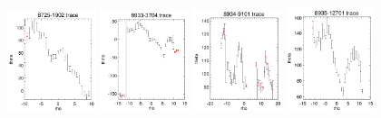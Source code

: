 \documentclass[fleqn,usenatbib]{mnras}
\begin{document}
\begin{figure}
    \includegraphics[width=0.23\textwidth]{Images/SN1-MC250/CPSBs/8725-1902-1-250.png}
    \includegraphics[width=0.23\textwidth]{Images/SN1-MC250/CPSBs/8933-3704-1-250.png}
    \includegraphics[width=0.23\textwidth]{Images/SN1-MC250/CPSBs/8934-9101-1-250.png}
    \includegraphics[width=0.23\textwidth]{Images/SN1-MC250/CPSBs/8935-12701-1-250.png}    
    \caption{}
    \label{fig:Radon-traces-CPSBs-1-SN1-MC250}
\end{figure}
\end{document}
